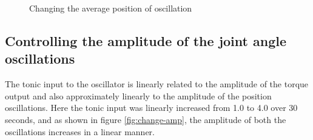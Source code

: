\documentclass[12pt,twoside]{article}
\theoremstyle{plain}
\theoremstyle{definition}
\theoremstyle{remark}
\begin{document}
\begin{figure}[htbp]
\centering     %
{}
\caption{Changing the average position of oscillation}
\label{fig:change-avg-pos}
\end{figure}

\subsection{Controlling the amplitude of the joint angle oscillations}
The tonic input to the oscillator is linearly related to the amplitude of the torque output and also approximately linearly to the amplitude of the position oscillations. Here the tonic input was linearly increased from 1.0 to 4.0 over 30 seconds, and as shown in figure \ref{fig:change-amp}, the amplitude of both the oscillations increases in a linear manner.
\end{document}

